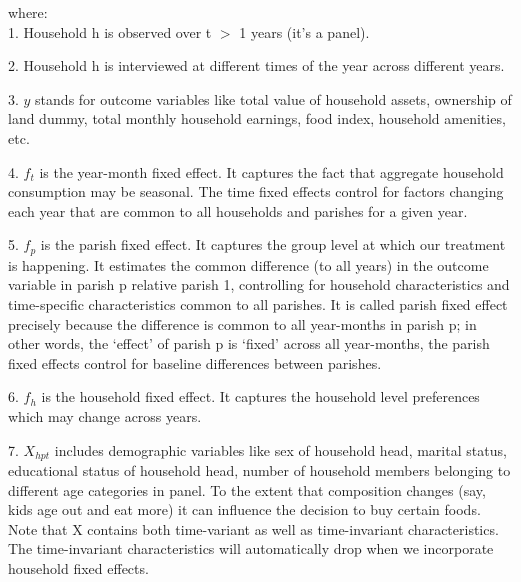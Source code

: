 \documentclass[12pt]{article}
\begin{document}
{where: \\

\hspace{1cm} 1. Household h is observed over t $>$ 1 years (it’s a panel).

\hspace{1cm} 2. Household h is interviewed at different times of the year across different years.

\hspace{1cm} 3. $y$ stands for outcome variables like total value of household assets, ownership of land dummy, total monthly household earnings, food index, household amenities, etc. 

\hspace{1cm} 4. $f_t$ is the year-month fixed effect. It captures the fact that aggregate household consumption may be seasonal. The time fixed effects control for factors changing each year that are common
to all households and parishes for a given year.

\hspace{1cm} 5. $f_p$ is the parish fixed effect. It captures the group level at which our treatment is happening. It estimates the common difference (to all years) in the outcome variable in parish p relative parish 1, controlling for household characteristics and time-specific characteristics common to all parishes. It is called parish fixed effect precisely because the difference is common to all year-months in parish p; in other words, the `effect' of parish p is `fixed' across all year-months, the parish fixed effects control for baseline differences between parishes.

\hspace{1cm} 6.  $f_h$ is the household fixed effect. It captures the household level preferences which may change across years.

\hspace{1cm} 7. $X_{hpt}$ includes demographic variables like sex of household head, marital status, educational status of household head, number of household members belonging to different age categories in panel. To the extent that composition changes (say, kids age out and eat more) it can influence the decision to buy certain foods. Note that X contains both time-variant as well as time-invariant characteristics. The time-invariant characteristics will automatically drop when we incorporate household fixed effects.

}
\end{document}
